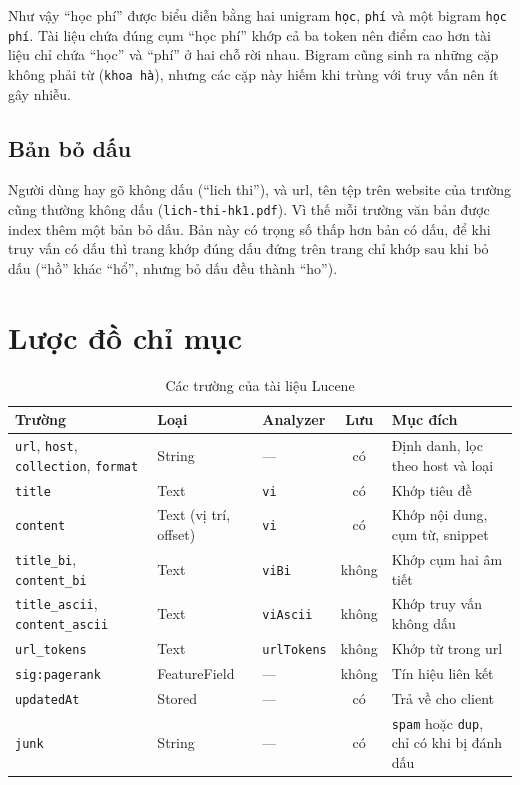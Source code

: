 \documentclass[12pt,a4paper]{report}
\begin{document}
Như vậy ``học phí'' được biểu diễn bằng hai unigram \texttt{học}, \texttt{phí} và một bigram \texttt{học phí}. Tài liệu
chứa đúng cụm ``học phí'' khớp cả ba token nên điểm cao hơn tài liệu chỉ chứa ``học'' và ``phí'' ở hai chỗ rời nhau.
Bigram cũng sinh ra những cặp không phải từ (\texttt{khoa hà}), nhưng các cặp này hiếm khi trùng với truy vấn nên ít
gây nhiễu.

\subsection{Bản bỏ dấu}

Người dùng hay gõ không dấu (``lich thi''), và url, tên tệp trên website của trường cũng thường không dấu
(\texttt{lich-thi-hk1.pdf}). Vì thế mỗi trường văn bản được index thêm một bản bỏ dấu. Bản này có trọng số thấp hơn bản
có dấu, để khi truy vấn có dấu thì trang khớp đúng dấu đứng trên trang chỉ khớp sau khi bỏ dấu (``hồ'' khác ``hổ'', nhưng
bỏ dấu đều thành ``ho'').

\section{Lược đồ chỉ mục}

\begin{table}[ht]
\centering
\caption{Các trường của tài liệu Lucene}\label{tab:fields}
\begin{tabularx}{\textwidth}{>{\raggedright\arraybackslash}p{3.1cm} l l c L}
\toprule
Trường & Loại & Analyzer & Lưu & Mục đích \\
\midrule
\texttt{url}, \texttt{host}, \texttt{collection}, \texttt{format} & String & --- & có & Định danh, lọc theo host và loại \\
\texttt{title} & Text & \texttt{vi} & có & Khớp tiêu đề \\
\texttt{content} & Text (vị trí, offset) & \texttt{vi} & có & Khớp nội dung, cụm từ, snippet \\
\texttt{title\_\allowbreak{}bi}, \texttt{content\_\allowbreak{}bi} & Text & \texttt{viBi} & không & Khớp cụm hai âm tiết \\
\texttt{title\_\allowbreak{}ascii}, \texttt{content\_\allowbreak{}ascii} & Text & \texttt{viAscii} & không & Khớp truy vấn không dấu \\
\texttt{url\_\allowbreak{}tokens} & Text & \texttt{urlTokens} & không & Khớp từ trong url \\
\texttt{sig:pagerank} & FeatureField & --- & không & Tín hiệu liên kết \\
\texttt{updatedAt} & Stored & --- & có & Trả về cho client \\
\texttt{junk} & String & --- & có & \texttt{spam} hoặc \texttt{dup}, chỉ có khi bị đánh dấu \\
\bottomrule
\end{tabularx}
\end{table}
\end{document}
